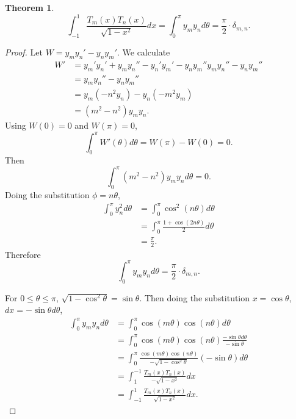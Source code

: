 \documentclass{article}
\newtheorem{theorem}{Theorem}
\theoremstyle{definition}
\begin{document}
\begin{theorem}
\[
\int_{-1}^1 \frac{T_m(x)T_n(x)}{\sqrt{1-x^2}} dx=
\int_0^\pi y_my_nd\theta = \frac{\pi}{2} \cdot \delta_{m,n}.
\]
\end{theorem}
\begin{proof}
Let $W=y_my_n'-y_ny_m'$. 
We calculate
\begin{align*}
W'&=y_m'y_n'+y_my_n''-y_n'y_m'-y_ny_m''
y_my_n''-y_ny_m''\\
&=y_my_n''-y_ny_m''\\
&=y_m(-n^2y_n) - y_n(-m^2y_m)\\
&=(m^2-n^2)y_my_n.
\end{align*}
Using $W(0)=0$ and $W(\pi)=0$,
\[
\int_0^\pi W'(\theta) d\theta = W(\pi)-W(0) = 0.
\]
Then
\[
\int_0^\pi (m^2-n^2)y_my_n d\theta = 0.
\]
Doing the substitution $\phi=n\theta$,
\begin{align*}
\int_0^\pi y_n^2 d\theta &= \int_0^\pi \cos^2(n\theta) d\theta\\
&=\int_0^\pi \frac{1+\cos(2n\theta)}{2} d\theta\\
&=\frac{\pi}{2}.
\end{align*}
Therefore
\[
\int_0^\pi y_my_nd\theta = \frac{\pi}{2} \cdot \delta_{m,n}.
\]

For $0 \leq \theta \leq \pi$, 
$\sqrt{1-\cos^2 \theta}=\sin \theta$. Then
doing the substitution $x=\cos \theta$, $dx=-\sin \theta d\theta$,
\begin{align*}
\int_0^\pi y_my_nd\theta&=\int_0^\pi \cos(m\theta) \cos(n\theta) d\theta\\
&=\int_0^\pi \cos(m\theta) \cos(n\theta) \frac{-\sin \theta d\theta}{-\sin \theta}\\
&=\int_0^\pi \frac{\cos(m\theta) \cos(n\theta)}{-\sqrt{1-\cos^2\theta}} (-\sin \theta) d\theta\\
&=\int_1^{-1} \frac{T_m(x)T_n(x)}{-\sqrt{1-x^2}} dx\\
&=\int_{-1}^1 \frac{T_m(x)T_n(x)}{\sqrt{1-x^2}} dx.
\end{align*}
\end{proof}
\end{document}
